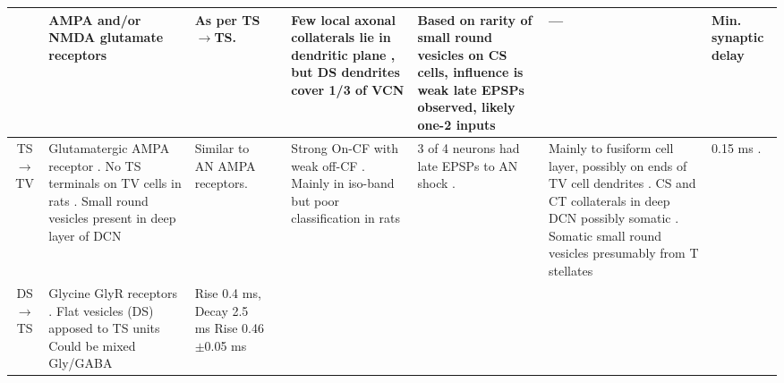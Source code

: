 \begin{longtable}{cYYYYYYY}
                                & %
AMPA and/or NMDA glutamate receptors \citep{FerragamoGoldingEtAl:1998a}  
                                & As per TS\ensuremath{\rightarrow}TS.
                                & %
                                & %
Few local axonal collaterals lie in dendritic plane \citep{SmithRhode:1989}, but DS dendrites cover 1/3 of VCN
                                & 
Based on rarity of small round vesicles on CS cells, influence is weak \citep{SmithRhode:1989} late EPSPs observed,
likely one-2 inputs \citep{FerragamoGoldingEtAl:1998a, OertelWuEtAl:1990} 
                                & ---                                     
                                & Min. synaptic delay \\ \midrule
TS\ensuremath{\rightarrow}TV                        
                                & %
Glutamatergic AMPA receptor  \citep{DoucetRossEtAl:1999,FerragamoGoldingEtAl:1998a,ZhangOertel:1993}.
No TS terminals on TV cells in rats \citep[rat][]{RubioJuiz:2004}.
Small round vesicles present in deep layer of DCN \citep[guinea pig][]{Alibardi:1999}
                                & 
Similar to AN AMPA receptors.        
                                & %
                                & %
Strong On-CF with weak off-CF  \citep[See fig 13][]{OstapoffBensonEtAl:1999}. 
Mainly in iso-band but poor classification in rats \citep{DoucetRossEtAl:1999,FriedlandPongstapornEtAl:2003}         
                                & %
3 of 4 neurons had late EPSPs to AN shock \citep[very young mice][]{ZhangOertel:1993}.
\citep{OstapoffMorestEtAl:1999} 
                                & %
Mainly to fusiform cell layer, possibly on ends of TV cell dendrites \citep[mouse][]{OertelWuEtAl:1990}. 
CS and CT collaterals in deep DCN possibly somatic \citep[guinea pig][]{PalmerWallaceEtAl:2003}.
Somatic small round vesicles presumably from T stellates  \citep[guinea pig][]{Alibardi:1999}   
                                & %
0.15 ms \citep[min EPSP latency to VCN Glutamate puffs, main excitation at 0.3 ms, AN shock produces late EPSPs about 3 msec][]{ZhangOertel:1993}.
\\ \midrule
DS\ensuremath{\rightarrow}TS                        
                                & %
Glycine GlyR receptors \citep[mouse][]{FerragamoGoldingEtAl:1998a}.
Flat vesicles (DS) apposed to TS units \citep[cat][]{SmithRhode:1989}     
Could be mixed Gly/GABA \citep{AltschulerJuizEtAl:1993} 
                                & %
Rise 0.4 ms, Decay 2.5 ms \citep[spontaneous IPSCs in rat MNTB neurons,][]{AwatramaniTurecekEtAl:2005}
Rise 0.46$\pm$0.05 ms \citep[spontaneous IPSCs in AVCN bushy cells, mouse][]{LimOleskevichEtAl:2003}


\end{longtable}
